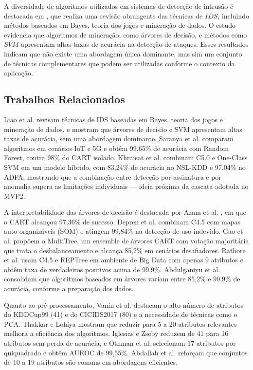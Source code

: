 \documentclass[a4paper,10pt, twocolumn]{article}
\begin{document}
A diversidade de algoritmos utilizados em sistemas de detecção de intrusão é 
destacada em \cite{Liao2013Intrusion}, que realiza uma revisão 
abrangente das técnicas de $IDS$, incluindo métodos baseados em Bayes, teoria 
dos jogos e mineração de dados. O estudo evidencia que algoritmos de 
mineração, como árvores de decisão, e métodos como $SVM$ apresentam altas taxas 
de acurácia na detecção de ataques. Esses resultados indicam que não existe 
uma abordagem única dominante, mas sim um conjunto de técnicas complementares 
que podem ser utilizadas conforme o contexto da aplicação.	

\subsection{Trabalhos Relacionados}
Liao et al.\cite{Liao2013Intrusion} revisam técnicas de IDS baseadas em Bayes, teoria dos jogos 
e mineração de dados, e mostram que árvores de decisão e SVM apresentam altas 
taxas de acurácia, sem uma abordagem dominante. Saranya et al. \cite{Saranya2020Performance} comparam 
algoritmos em cenários IoT e 5G e obtêm 99,65\% de acurácia com Random Forest, 
contra 98\% do CART isolado. Khraisat et al. \cite{Khraisat2019Hybrid} combinam C5.0 e One-Class SVM 
em um modelo híbrido, com 83,24\% de acurácia no NSL-KDD e 97,04\% no ADFA, mostrando 
que a combinação entre detecção por assinatura e por anomalia supera as limitações 
individuais — ideia próxima da cascata adotada no MVP2.

A interpretabilidade das árvores de decisão é destacada por Azam et al. \cite{zehedi2023comparative}, em que o CART alcançou 
97,36\% de sucesso. Depren et al. \cite{Depren2005Intelligent} combinam C4.5 com mapas auto-organizáveis (SOM) e atingem 
99,84\% na detecção de uso indevido. Gao et al. \cite{Xianwei2019Adaptive} propõem o MultiTree, um ensemble de árvores CART 
com votação majoritária que trata o desbalanceamento e alcança 85,2\% em cenários desafiadores. 
Rathore et al. \cite{Rathore2016RealTime} usam C4.5 e REPTree em ambiente de Big Data com apenas 9 atributos e obtêm taxa de 
verdadeiros positivos acima de 99,9\%. Abdulganiyu et al. \cite{Abdulganiyu2023Systematic} consolidam que algoritmos baseados em 
árvores variam entre 85,2\% e 99,9\% de acurácia, conforme a preparação dos dados.

Quanto ao pré-processamento, Vanin et al. \cite{patrick2022study} destacam o alto número de atributos 
do KDDCup99 (41) e do CICIDS2017 (80) e a necessidade de técnicas como o PCA. Thakkar e Lohiya \cite{Thakkar2021Survey} 
mostram que reduzir para 5 a 20 atributos relevantes melhora a eficiência dos algoritmos. 
Iglesias e Zseby \cite{felix2014analysis} reduzem de 41 para 16 atributos sem perda de acurácia, e Othman et al. \cite{Othman2018Intrusion} 
selecionam 17 atributos por quiquadrado e obtêm AUROC de 99,55\%. Abdallah et al. \cite{emad2022intrusion} reforçam que 
conjuntos de 10 a 19 atributos são comuns em abordagens eficientes. 
\end{document}
